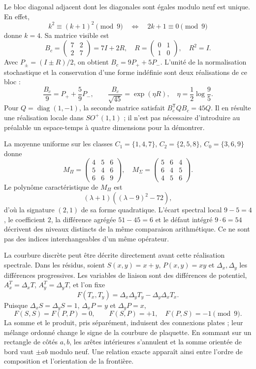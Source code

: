 Le bloc diagonal adjacent dont les diagonales sont égales modulo neuf est unique. En effet,
\[
 k^2\equiv(k+1)^2\pmod9\quad\Longleftrightarrow\quad2k+1\equiv0\pmod9
\]
donne \(k=4\). Sa matrice visible est
\[
 B_c=\begin{pmatrix}7&2\\2&7\end{pmatrix}=7I+2R,
 \quad R=\begin{pmatrix}0&1\\1&0\end{pmatrix},\quad R^2=I.
\]
Avec \(P_\pm=(I\pm R)/2\), on obtient \(B_c=9P_++5P_-\). L’unité de la normalisation stochastique et la conservation d’une forme indéfinie sont deux réalisations de ce bloc :
\[
 \frac{B_c}{9}=P_++\frac59P_-,\qquad
 \frac{B_c}{\sqrt{45}}=\exp(\eta R),\quad\eta=\frac12\log\frac95.
\]
Pour \(Q=\operatorname{diag}(1,-1)\), la seconde matrice satisfait \(B_c^{\mathsf T}QB_c=45Q\). Il en résulte une réalisation locale dans \(SO^+(1,1)\) ; il n’est pas nécessaire d’introduire au préalable un espace-temps à quatre dimensions pour la démontrer.

La moyenne uniforme sur les classes \(C_1=\{1,4,7\}\), \(C_2=\{2,5,8\}\), \(C_0=\{3,6,9\}\) donne
\[
 M_\Pi=\begin{pmatrix}4&5&6\\5&4&6\\6&6&9\end{pmatrix},\quad
 M_\Sigma=\begin{pmatrix}5&6&4\\6&4&5\\4&5&6\end{pmatrix}.
\]
Le polynôme caractéristique de \(M_\Pi\) est
\[
 (\lambda+1)((\lambda-9)^2-72),
\]
d’où la signature \((2,1)\) de sa forme quadratique. L’écart spectral local \(9-5=4\), le coefficient \(2\), la différence agrégée \(51-45=6\) et le défaut intégré \(9\cdot6=54\) décrivent des niveaux distincts de la même comparaison arithmétique. Ce ne sont pas des indices interchangeables d’un même opérateur.

La courbure discrète peut être décrite directement avant cette réalisation spectrale. Dans les résidus, soient \(S(x,y)=x+y\), \(P(x,y)=xy\) et \(\Delta_x,\Delta_y\) les différences progressives. Les variables de liaison sont des différences de potentiel, \(A_x^T=\Delta_xT\), \(A_y^T=\Delta_yT\), et l’on fixe
\[
 F(T_x,T_y)=\Delta_x\Delta_yT_y-\Delta_y\Delta_xT_x.
\]
Puisque \(\Delta_xS=\Delta_yS=1\), \(\Delta_xP=y\) et \(\Delta_yP=x\),
\begin{equation}
 F(S,S)=F(P,P)=0,\qquad F(S,P)=+1,\quad F(P,S)=-1\pmod9.
\end{equation}
La somme et le produit, pris séparément, induisent des connexions plates ; leur mélange ordonné change le signe de la courbure de plaquette. En sommant sur un rectangle de côtés \(a,b\), les arêtes intérieures s’annulent et la somme orientée de bord vaut \(\pm ab\) modulo neuf. Une relation exacte apparaît ainsi entre l’ordre de composition et l’orientation de la frontière.

